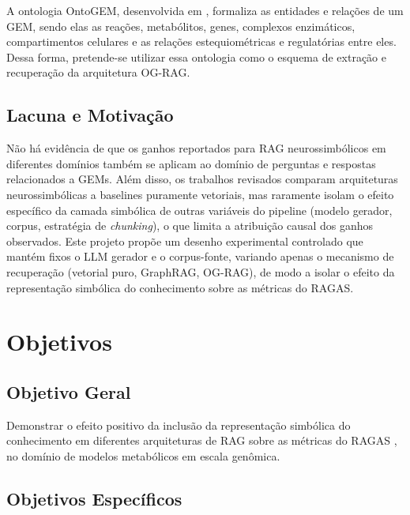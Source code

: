 \documentclass{article}
\begin{document}
	A ontologia OntoGEM, desenvolvida em \cite{souza2025ontogem}, formaliza as entidades e relações de um GEM, sendo elas as reações, metabólitos, genes, complexos enzimáticos, compartimentos celulares e as relações estequiométricas e regulatórias entre eles. Dessa forma, pretende-se utilizar essa ontologia como o esquema de extração e recuperação da arquitetura OG-RAG.
	
	\subsection{Lacuna e Motivação}
	
	Não há evidência de que os ganhos reportados para RAG neurossimbólicos em diferentes domínios também se aplicam ao domínio de perguntas e respostas relacionados a GEMs. Além disso, os trabalhos revisados comparam arquiteturas neurossimbólicas a baselines puramente vetoriais, mas raramente isolam o efeito específico da camada simbólica de outras variáveis do pipeline (modelo gerador, corpus, estratégia de \textit{chunking}), o que limita a atribuição causal dos ganhos observados. Este projeto propõe um desenho experimental controlado que mantém fixos o LLM gerador e o corpus-fonte, variando apenas o mecanismo de recuperação (vetorial puro, GraphRAG, OG-RAG), de modo a isolar o efeito da representação simbólica do conhecimento sobre as métricas do RAGAS.
	
	\newpage
	
	\section{Objetivos}
	
	\subsection{Objetivo Geral}
	
	Demonstrar o efeito positivo da inclusão da representação simbólica do conhecimento em diferentes arquiteturas de RAG sobre as métricas do RAGAS \cite{es-etal-2024-ragas}, no domínio de modelos metabólicos em escala genômica.
	
	\subsection{Objetivos Específicos}
	
\end{document}
